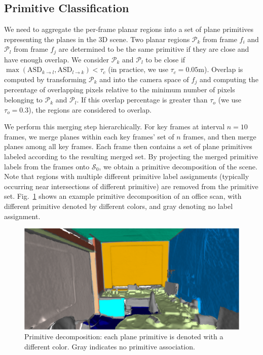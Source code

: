 \subsection{Primitive Classification}
\label{subsec:3dlite-plane-classify}

We need to aggregate the per-frame planar regions into a set of plane primitives representing the planes in the 3D scene.
Two planar regions $\mathcal{P}_k$ from frame $f_i$ and $\mathcal{P}_l$ from frame $f_j$ are determined to be the same primitive if they are close and have enough overlap. 
We consider $\mathcal{P}_k$ and $\mathcal{P}_l$ to be close if $\max(\textrm{ASD}_{k\rightarrow l}, \textrm{ASD}_{l\rightarrow k}) < \tau_c$ (in practice, we use $\tau_c = 0.05$m).
Overlap is computed by transforming $\mathcal{P}_k$ and into the camera space of $f_j$ and computing the percentage of overlapping pixels relative to the minimum number of pixels belonging to $\mathcal{P}_k$ and $\mathcal{P}_l$.
If this overlap percentage is greater than $\tau_o$ (we use $\tau_o = 0.3$), the regions are considered to overlap.

We perform this merging step hierarchically.
For key frames at interval $n = 10$ frames, we merge planes within each key frames' set of $n$ frames, and then merge planes among all key frames.
Each frame then contains a set of plane primitives labeled according to the resulting merged set.
By projecting the merged primitive labels from the frames onto $\mathcal{S}_0$, we obtain a primitive decomposition of the scene. 
Note that regions with multiple different primitive label assignments (typically occurring near intersections of different primitive) are removed from the primitive set.
Fig.~\ref{fig:3dlite-plane-classify} shows an example primitive decomposition of an office scan, with different primitive denoted by different colors, and gray denoting no label assignment.
 
\begin{figure}
    \centering
    \includegraphics[width=0.97\linewidth]{3dlite/fig3.png}
    \caption{
    	Primitive decomposition: each plane primitive is denoted with a different color. Gray indicates no primitive association.
    }
    \label{fig:3dlite-plane-classify}

\end{figure}

